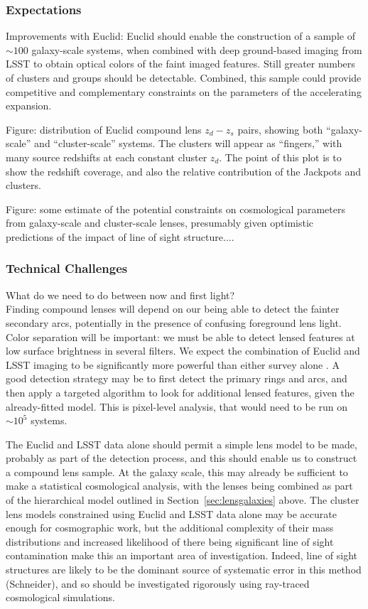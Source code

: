 \documentclass[twocolumn]{svjour3}
\begin{document}
\subsubsection{Expectations}

Improvements with Euclid: Euclid should enable the construction of a
sample of $\sim100$ galaxy-scale systems, when combined with deep
ground-based imaging from LSST to obtain optical colors of the faint
imaged features. Still greater numbers of clusters and groups should be
detectable. Combined, this sample could provide competitive and
complementary constraints on the parameters of the accelerating
expansion.

Figure: distribution of Euclid compound lens $z_d - z_s$ pairs, showing
both ``galaxy-scale'' and ``cluster-scale'' systems. The clusters will
appear as ``fingers,'' with many source redshifts at each constant
cluster $z_d$. The point of this plot is to show the redshift coverage,
and also the relative contribution of the Jackpots and clusters.

Figure: some estimate of the potential constraints on cosmological
parameters from galaxy-scale and cluster-scale lenses, presumably given
optimistic predictions of the impact of line of sight structure....


\subsubsection{Technical Challenges}

What do we need to do between now and first light?\\

Finding compound lenses will depend on our being able to detect the
fainter secondary arcs, potentially in the presence of confusing
foreground lens light. Color separation will be important: we must be
able to detect lensed features at low surface brightness in several
filters. We expect the combination of Euclid and LSST imaging to be
significantly more powerful than either survey alone \citep{JainEtal2015}. 
A good detection
strategy may be to first detect the primary rings and arcs, and then
apply a targeted algorithm to look for additional lensed features, given
the already-fitted model. This is pixel-level analysis, that would need
to be run on $\sim 10^5$ systems.

The Euclid and LSST data alone should permit a simple lens model to be
made, probably as part of the detection process, and this should enable
us to construct a compound lens sample. At the galaxy scale, this may
already be sufficient to make a statistical cosmological analysis, with
the lenses being combined as part of the hierarchical model outlined in
Section~\ref{sec:lensgalaxies} above. The cluster lens models
constrained using Euclid and LSST data alone may be accurate enough for
cosmographic work, but the additional complexity of their mass
distributions and increased likelihood of there being significant line
of sight contamination make this an important area of investigation.
Indeed, line of sight structures are likely to be the dominant source of
systematic error in this method (Schneider), and so should be
investigated rigorously using ray-traced cosmological simulations.
\end{document}
